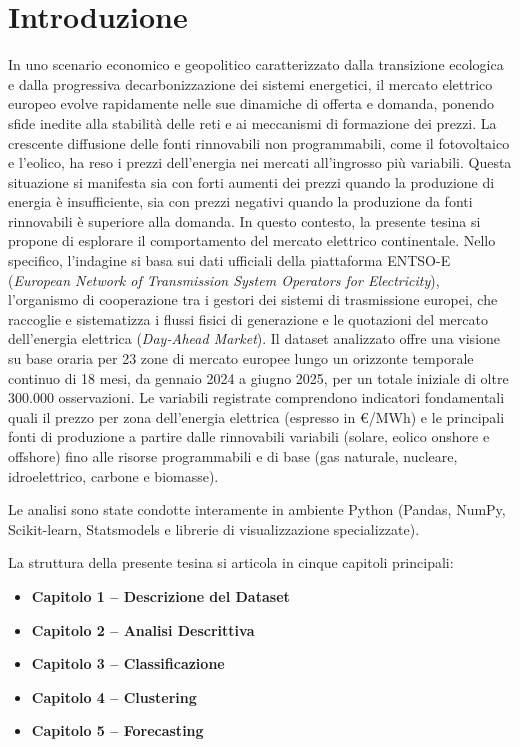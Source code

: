 {}
\chapter*{Introduzione}

In uno scenario economico e geopolitico caratterizzato dalla transizione ecologica e dalla progressiva decarbonizzazione dei sistemi energetici, il mercato elettrico europeo evolve rapidamente nelle sue dinamiche di offerta e domanda, ponendo sfide inedite alla stabilità delle reti e ai meccanismi di formazione dei prezzi. La crescente diffusione delle fonti rinnovabili non programmabili, come il fotovoltaico e l’eolico, ha reso i prezzi dell’energia nei mercati all’ingrosso più variabili. Questa situazione si manifesta sia con forti aumenti dei prezzi quando la produzione di energia è insufficiente, sia con prezzi negativi quando la produzione da fonti rinnovabili è superiore alla domanda. In questo contesto, la presente tesina si propone di esplorare il comportamento del mercato elettrico continentale.
Nello specifico, l'indagine si basa sui dati ufficiali della piattaforma ENTSO-E (\textit{European Network of Transmission System Operators for Electricity}), l'organismo di cooperazione tra i gestori dei sistemi di trasmissione europei, che raccoglie e sistematizza i flussi fisici di generazione e le quotazioni del mercato dell'energia elettrica (\textit{Day-Ahead Market}). Il dataset analizzato offre una visione su base oraria per 23 zone di mercato europee lungo un orizzonte temporale continuo di 18 mesi, da gennaio 2024 a giugno 2025, per un totale iniziale di oltre 300.000 osservazioni. Le variabili registrate comprendono indicatori fondamentali quali il prezzo per zona dell'energia elettrica (espresso in \euro/MWh) e le principali fonti di produzione a partire dalle rinnovabili variabili (solare, eolico onshore e offshore) fino alle risorse programmabili e di base (gas naturale, nucleare, idroelettrico, carbone e biomasse).

Le analisi sono state condotte interamente in ambiente Python (Pandas, NumPy, Scikit-learn, Statsmodels e librerie di visualizzazione specializzate).

La struttura della presente tesina si articola in cinque capitoli principali:
\begin{itemize}
    \item \textbf{Capitolo 1 -- Descrizione del Dataset}
    \item \textbf{Capitolo 2 -- Analisi Descrittiva}
    \item \textbf{Capitolo 3 -- Classificazione}
    \item \textbf{Capitolo 4 -- Clustering}
    \item \textbf{Capitolo 5 -- Forecasting}
\end{itemize}
